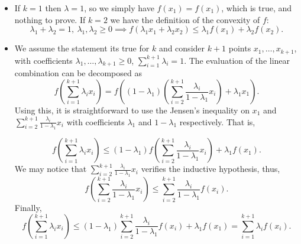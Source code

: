\documentclass[12pt]{scrartcl}
\begin{document}
\begin{itemize}
    \item If $k=1$ then $\lambda = 1$, so we simply have $f(x_1) = f(x_1)$, which is true, and
    nothing to prove. If $k=2$ we have the definition of the convexity of $f$:
    \begin{equation*}
        \lambda_1 + \lambda_2 = 1, \ \lambda_1, \lambda_2 \geq 0 \implies f(\lambda_1 x_1 + \lambda_2 x_2) \leq \lambda_1 f(x_1) + \lambda_2 f(x_2).
    \end{equation*}
    \item We assume the statement its true for $k$ and consider $k+1$ points $x_1, \dots, x_{k+1}$, with coefficients $\lambda_1, \dots, \lambda_{k+1} \geq 0$, $\sum_{i=1}^{k+1} \lambda_i = 1$. The evaluation of the linear combination can be decomposed as
    \begin{equation*}
        f\left( \sum_{i=1}^{k+1} \lambda_i  x_i \right) = f\left( (1-\lambda_1) \left(\sum_{i=2}^{k+1} \frac{\lambda_i}{1-\lambda_1} x_i\right) + \lambda_1 x_1\right).
    \end{equation*}
    Using this, it is straightforward to use the Jensen's inequality on $x_1$ and $\sum_{i=2}^{k+1} \frac{\lambda_i}{1-\lambda_1} x_i $ with coefficients $\lambda_1$ and $1-\lambda_1$  respectively.  That is,

    \begin{equation*}
        f\left( \sum_{i=1}^{k+1} \lambda_i  x_i \right) \leq (1 - \lambda_1) f \left( \sum_{i=2}^{k+1} \frac{\lambda_i}{1-\lambda_1} x_i \right) + \lambda_1 f(x_1).
    \end{equation*}
    We may notice that $\sum_{i=2}^{k+1} \frac{\lambda_i}{1-\lambda_1} x_i$ verifies the inductive hypothesis, thus,
    \begin{equation*}
        f \left( \sum_{i=2}^{k+1} \frac{\lambda_i}{1-\lambda_1} x_i \right) \leq \sum_{i=2}^{k+1} \frac{\lambda_i}{1-\lambda_1} f(x_i).
    \end{equation*}
    Finally,
    \begin{equation*}
        f\left(\sum_{i=1}^{k+1} \lambda_i x_i \right) \leq (1-\lambda_1) \sum_{i = 2}^{k+1} \frac{\lambda_i}{1-\lambda_1}f(x_i) + \lambda_1 f(x_1) = \sum_{i=1}^{k+1} \lambda_i f(x_i).
    \end{equation*}
\end{itemize}


\vspace{0.5em}

\end{document}
